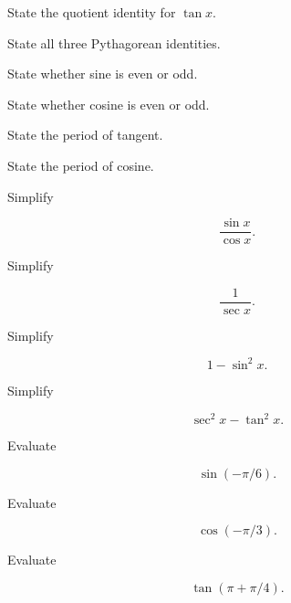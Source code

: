 \begin{exercise}[1]
State the quotient identity for \(\tan x\).
\end{exercise}

\begin{exercise}[1]
State all three Pythagorean identities.
\end{exercise}

\begin{exercise}[1]
State whether sine is even or odd.
\end{exercise}

\begin{exercise}[1]
State whether cosine is even or odd.
\end{exercise}

\begin{exercise}[1]
State the period of tangent.
\end{exercise}

\begin{exercise}[1]
State the period of cosine.
\end{exercise}

\begin{exercise}[2]
Simplify

\[
\frac{\sin x}{\cos x}.
\]
\end{exercise}

\begin{exercise}[2]
Simplify

\[
\frac{1}{\sec x}.
\]
\end{exercise}

\begin{exercise}[2]
Simplify

\[
1-\sin^2x.
\]
\end{exercise}

\begin{exercise}[2]
Simplify

\[
\sec^2x-\tan^2x.
\]
\end{exercise}

\begin{exercise}[2]
Evaluate

\[
\sin(-\pi/6).
\]
\end{exercise}

\begin{exercise}[2]
Evaluate

\[
\cos(-\pi/3).
\]
\end{exercise}

\begin{exercise}[2]
Evaluate

\[
\tan(\pi+\pi/4).
\]
\end{exercise}

